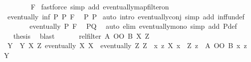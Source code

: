 \begin{isabellebody}
\ \ \ \ \ \ \isamarkupfalse%
\ F\ \isamarkupfalse%
{\isacharparenleft}{\kern0pt}fastforce\ simp\ add{\isacharcolon}{\kern0pt}\ eventually{\isacharunderscore}{\kern0pt}map{\isacharunderscore}{\kern0pt}filter{\isacharunderscore}{\kern0pt}on{\isacharparenright}{\kern0pt}\isanewline
\ \ \ \ \isamarkupfalse%
\ {\isachardoublequoteopen}eventually\ {\isacharparenleft}{\kern0pt}inf\ P{\isacharprime}{\kern0pt}{\isacharprime}{\kern0pt}\ {\isacharquery}{\kern0pt}P{\isacharparenright}{\kern0pt}\ F{\isachardoublequoteclose}\ \isamarkupfalse%
\ P{\isacharprime}{\kern0pt}{\isacharprime}{\kern0pt}\ P{\isacharprime}{\kern0pt}\ \isamarkupfalse%
{\isacharparenleft}{\kern0pt}auto\ intro{\isacharcolon}{\kern0pt}\ eventually{\isacharunderscore}{\kern0pt}conj\ simp\ add{\isacharcolon}{\kern0pt}\ inf{\isacharunderscore}{\kern0pt}fun{\isacharunderscore}{\kern0pt}def{\isacharparenright}{\kern0pt}\isanewline
\ \ \ \ \isamarkupfalse%
\ \isamarkupfalse%
\ {\isachardoublequoteopen}eventually\ P{\isacharprime}{\kern0pt}\ F{\isachardoublequoteclose}\ \isamarkupfalse%
\ P{\isacharprime}{\kern0pt}{\isacharprime}{\kern0pt}Q\ \ \isamarkupfalse%
{\isacharparenleft}{\kern0pt}auto\ elim{\isacharbang}{\kern0pt}{\isacharcolon}{\kern0pt}\ eventually{\isacharunderscore}{\kern0pt}mono\ simp\ add{\isacharcolon}{\kern0pt}\ P{\isacharprime}{\kern0pt}{\isacharunderscore}{\kern0pt}def{\isacharparenright}{\kern0pt}\isanewline
\ \ \ \ \isamarkupfalse%
\ \isamarkupfalse%
\ {\isacharquery}{\kern0pt}thesis\ \isamarkupfalse%
\ blast\isanewline
\ \ \isamarkupfalse%
\isanewline
\isanewline
\ \ \isamarkupfalse%
\ {\isachardoublequoteopen}rel{\isacharunderscore}{\kern0pt}filter\ {\isacharparenleft}{\kern0pt}A\ OO\ B{\isacharparenright}{\kern0pt}\ {\isacharquery}{\kern0pt}X\ {\isacharquery}{\kern0pt}Z{\isachardoublequoteclose}\isanewline
\ \ \isamarkupfalse%
\isanewline
\ \ \ \ \isamarkupfalse%
\ {\isacharquery}{\kern0pt}Y\ {\isacharequal}{\kern0pt}\ {\isachardoublequoteopen}{\isasymlambda}Y{\isachardot}{\kern0pt}\ {\isasymexists}X\ Z{\isachardot}{\kern0pt}\ eventually\ X\ {\isacharquery}{\kern0pt}X\ {\isasymand}\ eventually\ Z\ {\isacharquery}{\kern0pt}Z\ {\isasymand}\ {\isacharparenleft}{\kern0pt}{\isasymlambda}{\isacharparenleft}{\kern0pt}x{\isacharcomma}{\kern0pt}\ z{\isacharparenright}{\kern0pt}{\isachardot}{\kern0pt}\ X\ x\ {\isasymand}\ Z\ z\ {\isasymand}\ {\isacharparenleft}{\kern0pt}A\ OO\ B{\isacharparenright}{\kern0pt}\ x\ z{\isacharparenright}{\kern0pt}\ {\isasymle}\ Y{\isachardoublequoteclose}\isanewline

\end{isabellebody}
